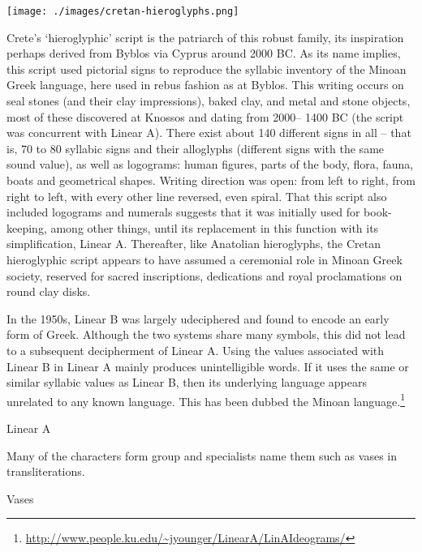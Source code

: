 \texttt{[image: ./images/cretan-hieroglyphs.png]}

\medskip
Crete’s `hieroglyphic’ script is the patriarch of this robust
family, its inspiration perhaps derived from Byblos via Cyprus
around 2000 BC. As its name implies, this script used
pictorial signs to reproduce the syllabic inventory of the Minoan
Greek language, here used in rebus fashion as at Byblos. This
writing occurs on seal stones (and their clay impressions), baked
clay, and metal and stone objects, most of these discovered at
Knossos and dating from 2000– 1400 BC (the script was concurrent
with Linear A). There exist about 140 different signs in all –
that is, 70 to 80 syllabic signs and their alloglyphs (different signs
with the same sound value), as well as logograms: human figures,
parts of the body, flora, fauna, boats and geometrical shapes.
Writing direction was open: from left to right, from right to left,
with every other line reversed, even spiral. That this script also
included logograms and numerals suggests that it was initially
used for book-keeping, among other things, until its replacement
in this function with its simplification, Linear A. Thereafter, like
Anatolian hieroglyphs, the Cretan hieroglyphic script appears to
have assumed a ceremonial role in Minoan Greek society,
reserved for sacred inscriptions, dedications and royal proclamations
on round clay disks.

In the 1950s, Linear B was largely udeciphered and found to encode an early form of Greek. Although the two systems share many symbols, this did not lead to a subsequent decipherment of Linear A. Using the values associated with Linear B in Linear A mainly produces unintelligible words. If it uses the same or similar syllabic values as Linear B, then its underlying language appears unrelated to any known language. This has been dubbed the Minoan language.\footnote{\url{http://www.people.ku.edu/~jyounger/LinearA/LinAIdeograms/}}

\begin{scriptexample}[]{Linear A}
\end{scriptexample}

Many of the characters form group and specialists name them such as vases in transliterations.

\begin{scriptexample}[]{Vases}
\begin{center}
\end{center}
\end{scriptexample}

